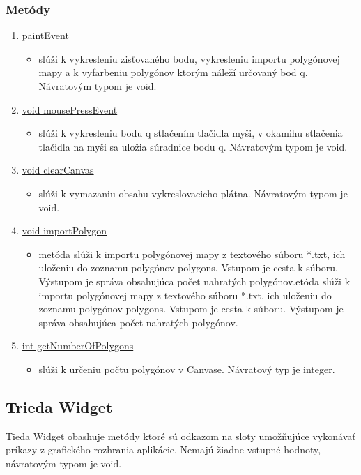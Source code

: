 \documentclass[12pt]{article}
\begin{document}
\subsubsection{Metódy}
\begin{enumerate}
\item[] \underline{paintEvent}
\begin{itemize}
\item slúži k vykresleniu zisťovaného bodu, vykresleniu importu polygónovej mapy a k vyfarbeniu polygónov ktorým náleží určovaný bod q. Návratovým typom je void.
\end{itemize}
\item[] \underline{void mousePressEvent}
\begin{itemize}
\item slúži k vykresleniu bodu q stlačením tlačidla myši, v okamihu stlačenia tlačidla na myši sa uložia súradnice bodu q. Návratovým typom je void.
\end{itemize}
\item[] \underline{void clearCanvas}
\begin{itemize}
\item slúži k vymazaniu obsahu vykreslovacieho plátna. Návratovým typom je void.
\end{itemize}
\item[] \underline{void importPolygon}
\begin{itemize}
\item metóda slúži k importu polygónovej mapy z textového súboru *.txt, ich uloženiu do zoznamu polygónov polygons. Vstupom je cesta k súboru. Výstupom je správa obsahujúca počet nahratých polygónov.etóda slúži k importu polygónovej mapy z textového súboru *.txt, ich uloženiu do zoznamu polygónov polygons. Vstupom je cesta k súboru. Výstupom je správa obsahujúca počet nahratých polygónov.
\end{itemize}
\item[] \underline{int getNumberOfPolygons}
\begin{itemize}
\item slúži k určeniu počtu polygónov v Canvase. Návratový typ je integer.
\end{itemize}
\end{enumerate}

\subsection{Trieda Widget}
Tieda Widget obashuje metódy ktoré sú odkazom na sloty umožňujúce vykonávať príkazy z grafického rozhrania aplikácie. Nemajú žiadne vstupné hodnoty, návratovým typom je void.
\end{document}
